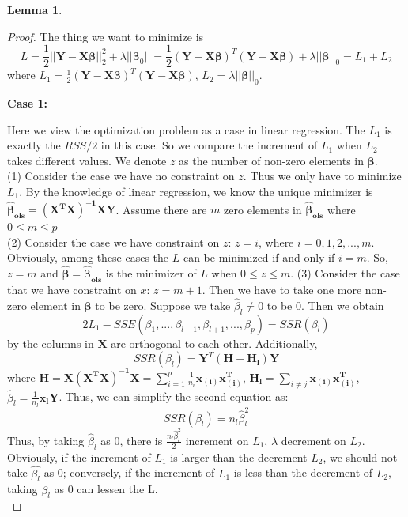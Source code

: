 \documentclass{article}
\newtheorem{lemma}{Lemma}
\newtheorem{proof}{Proof}
\begin{document}
\begin{appendices}
\begin{lemma}
	\end{lemma}
	\begin{proof}
		The thing we want to minimize is
		\begin{equation*}
		L=\frac{1}{2}||\mathbf{Y-X}\bm{\beta}||^2_2+\lambda||\bm{\beta}_0||=\frac{1}{2}(\mathbf{Y-X}\bm{\beta})^T(\mathbf{Y-X}\bm{\beta})+\lambda ||\bm{\beta}||_0=L_1+L_2
		\end{equation*} 
		where $L_1=\frac{1}{2}(\mathbf{Y-X}\bm{\beta})^T(\mathbf{Y-X}\bm{\beta})$, $L_2=\lambda ||\bm{\beta}||_0$. 
	
	\textbf{Case 1:}\par 
	 Here we view the optimization problem as a case in linear regression. 
	The $L_1$ is exactly the $RSS/2$ in this case. So we compare the increment of $L_1$  when $L_2$ takes different values. We denote $z$ as the number of  non-zero elements in $\bm{\beta}$.\\
	(1) Consider the case we have no constraint on $z$. Thus we only have to minimize $L_1$. By the knowledge of linear regression, we know the unique minimizer is $\bm{\hat{\beta}_{ols}}=\mathbf{(X^TX)^{-1}XY}$. Assume there are $m$ zero elements in $\bm{\hat{\beta}_{ols}}$ where $0\leq m \leq p$ \\
	(2) Consider the case we have constraint on $z$: $z = i$, where $i=0,1,2,...,m$. Obviously, among these cases the $L$ can be minimized if and only if $i=m$. So, $z=m$ and $\bm{\hat{\beta}}=\bm{\hat{\beta}_{ols}}$ is the minimizer of $L$ when $0\leq z\leq m$.
	(3) Consider the case that we have constraint on $x$: $z=m+1$. Then we have to take one more non-zero element in $\bm{\beta}$ to be zero. Suppose we take $\hat{\beta}_l \neq 0$ to be 0. Then we obtain 
	\begin{equation*}
		2L_1 -SSE(\beta_1,...,\beta_{l-1},\beta_{l+1},...,\beta_p)=SSR(\beta_l)
	\end{equation*}
	by the columns in $\mathbf{X}$ are orthogonal to each other. Additionally,
	\begin{equation*}
		SSR(\beta_l) = \mathbf{Y}^T(\mathbf{H-H_l})\mathbf{Y} 
	\end{equation*}
	where $\mathbf{H=X(X^TX)^{-1}X}=\sum_{i=1}^p\frac{1}{n_i}\mathbf{x_{(i)}x_{(i)}^T}$, $\mathbf{H_l} = \sum_{i\neq j}\mathbf{x_{(i)}x_{(i)}^T}$, $\hat{\beta}_l = \frac{1}{n_l}\mathbf{x_{l}Y}$. Thus, we can simplify the second equation as:
	\begin{equation*}
		SSR(\beta_l) = n_l\hat{\beta}_l^2
	\end{equation*}
	Thus, by taking $\hat{\beta}_l$ as 0, there is $\frac{n_l\hat{\beta}_l^2}{2}$ increment on $L_1$, $\lambda$ decrement on $L_2$. Obviously, if the increment of $L_1$ is larger than the decrement $L_2$, we should not take $\hat{\beta_l}$ as 0; conversely, if the increment of $L_1$ is less than the decrement of $L_2$, taking $\hat{\beta_l}$ as 0 can lessen the L.\\

\end{proof}
\end{appendices}
\end{document}

